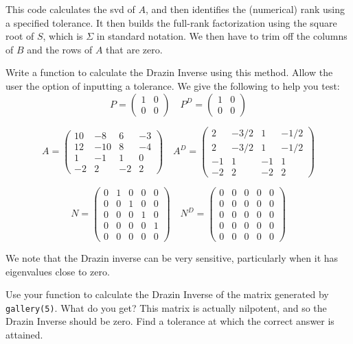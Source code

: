 This code calculates the svd of $A$, and then identifies the (numerical) rank using a specified tolerance. It then builds the full-rank factorization using the square root of $S$, which is $\Sigma$ in standard notation. We then have to trim off the columns of $B$ and the rows of $A$ that are zero.

\begin{problem}
Write a function to calculate the Drazin Inverse using this method. Allow the user the option of inputting a tolerance. We give the following to help you test:
\[
P = \begin{pmatrix}
1 & 0 \\
0 & 0 
\end{pmatrix} \quad P^D = \begin{pmatrix}
1 & 0 \\
0 & 0 
\end{pmatrix}
\]

\[
A = \begin{pmatrix}
10 & -8 & 6 & -3 \\
12 & -10 & 8 & -4 \\
1 & -1 & 1 & 0 \\
-2 & 2 & -2 & 2
\end{pmatrix} \quad A^D = \begin{pmatrix}
2 & -3/2 & 1 & -1/2 \\
2 & -3/2 & 1 & -1/2 \\
-1 & 1 & -1 & 1 \\
-2 & 2 & -2 & 2
\end{pmatrix}
\]

\[
N = \begin{pmatrix}
0&1&0&0&0 \\
0&0&1&0&0 \\
0&0&0&1&0 \\
0&0&0&0&1 \\
0&0&0&0&0
\end{pmatrix} \quad N^D = \begin{pmatrix}
0&0&0&0&0 \\
0&0&0&0&0 \\
0&0&0&0&0 \\
0&0&0&0&0 \\
0&0&0&0&0
\end{pmatrix}
\]
\end{problem}

We note that the Drazin inverse can be very sensitive, particularly when it has eigenvalues close to zero.

\begin{problem}
Use your function to calculate the Drazin Inverse of the matrix generated by {\tt gallery(5)}. What do you get? This matrix is actually nilpotent, and so the Drazin Inverse should be zero. Find a tolerance at which the correct answer is attained.
\end{problem}





